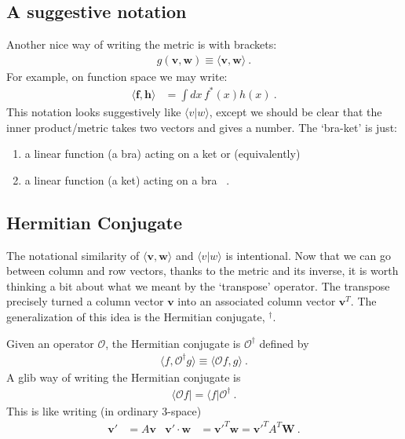 \documentclass[12pt]{article}
\numberwithin{equation}{section}    %
\renewcommand{\vec}[1]{\mathbf{#1}} %
\begin{document}
\subsection{A suggestive notation}

Another nice way of writing the metric is with brackets:
\begin{align}
  g(\vec{v}, \vec{w}) \equiv \langle \vec{v} , \vec{w}\rangle \ .
\end{align}
For example, on function space we may write:
\begin{align}
  \langle \vec f, \vec h\rangle &= \int dx \, f^*(x) h(x) \ .
\end{align}
This notation looks suggestively like $\langle v | w \rangle$, except we should be clear that the inner product/metric takes two vectors and gives a number. The `bra-ket’ is just:
\begin{enumerate}
\item a linear function (a bra) acting on a ket or (equivalently)
\item a linear function (a ket) acting on a bra \ .
\end{enumerate} 



\subsection{Hermitian Conjugate}

The notational similarity of $\langle \vec{v} , \vec{w}\rangle$ and $\langle v | w \rangle$ is intentional.
%
Now that we can go between column and row vectors, thanks to the metric and its inverse, it is worth thinking a bit about what we meant by the `transpose’ operator. The transpose precisely turned a column vector $\vec{v}$ into an associated column vector $\vec{v}^T$. The generalization of this idea is the Hermitian conjugate, $^\dag$. 

Given an operator $\mathcal O$, the Hermitian conjugate is $\mathcal O^\dag$ defined by
\begin{align}
  \langle f,\mathcal O^\dag g \rangle \equiv \langle \mathcal O f,  g \rangle \ .
\end{align}
A glib way of writing the Hermitian conjugate is
\begin{align}
  \langle \mathcal O f | = \langle f | \mathcal O^\dag \ .
\end{align}
This is like writing (in ordinary 3-space)
\begin{align}
  \vec{v}' &= A \vec v &
  \vec v' \cdot \vec w &= \vec{v'}^T \vec{w} = \vec{v'}^T A^T \vec{W} \ .
\end{align}
\end{document}
